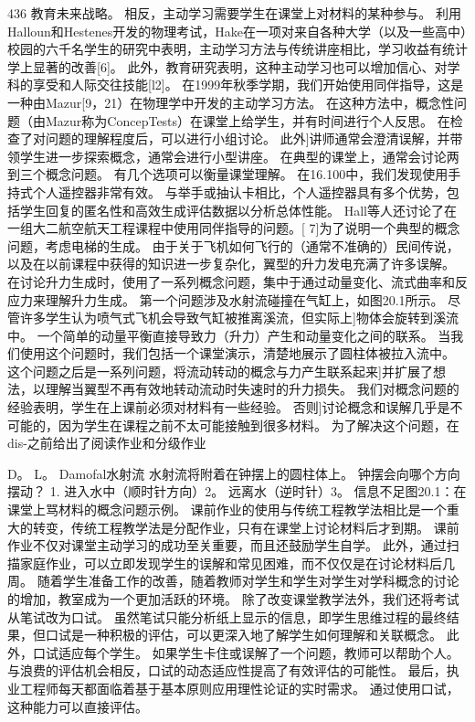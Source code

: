 \documentclass[UTF8,11pt,a4paper,openany,fontset=fandol]{ctexbook}
\begin{document}
436 教育未来战略。 相反，主动学习需要学生在课堂上对材料的某种参与。 利用Halloun和Hestenes开发的物理考试，Hake在一项对来自各种大学（以及一些高中）校园的六千名学生的研究中表明，主动学习方法与传统讲座相比，学习收益有统计学上显著的改善[6]。 此外，教育研究表明，这种主动学习也可以增加信心、对学科的享受和人际交往技能[l2]。 在1999年秋季学期，我们开始使用同伴指导，这是一种由Mazur[9，21）在物理学中开发的主动学习方法。 在这种方法中，概念性问题（由Mazur称为ConcepTests）在课堂上给学生，并有时间进行个人反思。 在检查了对问题的理解程度后，可以进行小组讨论。 此外]讲师通常会澄清误解，并带领学生进一步探索概念，通常会进行小型讲座。 在典型的课堂上，通常会讨论两到三个概念问题。 有几个选项可以衡量课堂理解。 在16.100中，我们发现使用手持式个人遥控器非常有效。 与举手或抽认卡相比，个人遥控器具有多个优势，包括学生回复的匿名性和高效生成评估数据以分析总体性能。 Hall等人还讨论了在一组大二航空航天工程课程中使用同伴指导的问题。[ 7]为了说明一个典型的概念问题，考虑电梯的生成。 由于关于飞机如何飞行的（通常不准确的）民间传说，以及在以前课程中获得的知识进一步复杂化，翼型的升力发电充满了许多误解。 在讨论升力生成时，使用了一系列概念问题，集中于通过动量变化、流式曲率和反应力来理解升力生成。 第一个问题涉及水射流碰撞在气缸上，如图20.1所示。 尽管许多学生认为喷气式飞机会导致气缸被推离溪流，但实际上]物体会旋转到溪流中。 一个简单的动量平衡直接导致力（升力）产生和动量变化之间的联系。 当我们使用这个问题时，我们包括一个课堂演示，清楚地展示了圆柱体被拉入流中。 这个问题之后是一系列问题，将流动转动的概念与力产生联系起来]并扩展了想法，以理解当翼型不再有效地转动流动时失速时的升力损失。 我们对概念问题的经验表明，学生在上课前必须对材料有一些经验。 否则]讨论概念和误解几乎是不可能的，因为学生在课程之前不太可能接触到很多材料。 为了解决这个问题，在dis-之前给出了阅读作业和分级作业

D。 L。 Damofal水射流 水射流将附着在钟摆上的圆柱体上。 钟摆会向哪个方向摆动？ 1. 进入水中（顺时针方向）2。 远离水（逆时针）3。 信息不足图20.1：在课堂上骂材料的概念问题示例。 课前作业的使用与传统工程教学法相比是一个重大的转变，传统工程教学法是分配作业，只有在课堂上讨论材料后才到期。 课前作业不仅对课堂主动学习的成功至关重要，而且还鼓励学生自学。 此外，通过扫描家庭作业，可以立即发现学生的误解和常见困难，而不仅仅是在讨论材料后几周。 随着学生准备工作的改善，随着教师对学生和学生对学生对学科概念的讨论的增加，教室成为一个更加活跃的环境。 除了改变课堂教学法外，我们还将考试从笔试改为口试。 虽然笔试只能分析纸上显示的信息，即学生思维过程的最终结果，但口试是一种积极的评估，可以更深入地了解学生如何理解和关联概念。 此外，口试适应每个学生。 如果学生卡住或误解了一个问题，教师可以帮助个人。 与浪费的评估机会相反，口试的动态适应性提高了有效评估的可能性。 最后，执业工程师每天都面临着基于基本原则应用理性论证的实时需求。 通过使用口试，这种能力可以直接评估。
\end{document}

